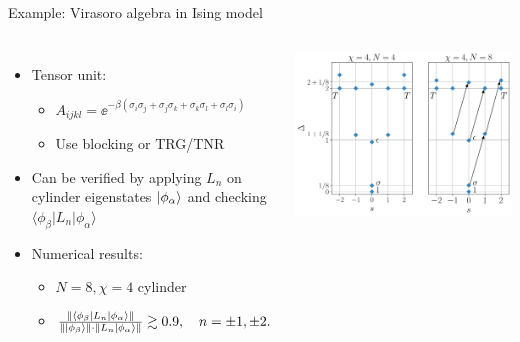\documentclass{fdubeamer}
\begin{document}
\begin{frame}{Example: Virasoro algebra in Ising model}

\begin{columns}[T]


    \begin{itemize}
      \item Tensor unit:

        \begin{itemize}
          \item $A_{ijkl} = \ee^{-\beta (\sigma_i\sigma_j + \sigma_j\sigma_k + \sigma_k\sigma_l + \sigma_l\sigma_i)}$
          \item Use blocking or TRG/TNR
        \end{itemize}

      \item Can be verified by applying $L_n$ on cylinder eigenstates $\ket{\phi_\alpha}$ and checking $\langle\phi_\beta|L_n|\phi_\alpha\rangle$
      \item Numerical results:

        \begin{itemize}
          \item $N=8, \chi=4$ cylinder \\[1ex]
          \item $
              \frac{\lVert \langle\phi_\beta|L_n|\phi_\alpha\rangle \rVert}{\lVert \ket*{\phi_\beta} \rVert \cdot \lVert L_n\ket*{\phi_\alpha} \rVert} \gtrsim 0.9, \quad
              n=\pm1, \pm2.
            $
        \end{itemize}
    \end{itemize}


    \vspace{1em}
    \includegraphics[width=\textwidth]{images/virasoro/ising-spectrum.pdf}

\end{columns}


\end{frame}
\end{document}
